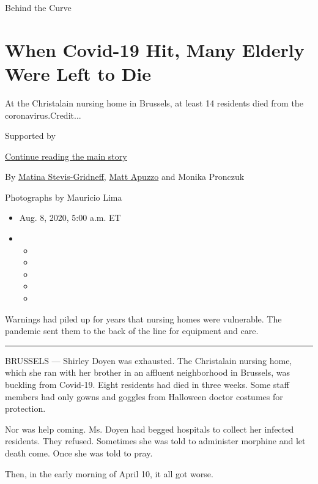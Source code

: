 Behind the Curve

\hypertarget{when-covid-19-hit-many-elderly-were-left-to-die}{%
\section{When Covid-19 Hit, Many Elderly Were Left to
Die}\label{when-covid-19-hit-many-elderly-were-left-to-die}}

At the Christalain nursing home in Brussels, at least 14 residents died
from the coronavirus.Credit...

Supported by

\protect\hyperlink{after-sponsor}{Continue reading the main story}

By \href{https://www.nytimes.com/by/matina-stevis-gridneff}{Matina
Stevis-Gridneff}, \href{https://www.nytimes.com/by/matt-apuzzo}{Matt
Apuzzo} and Monika Pronczuk

Photographs by Mauricio Lima

\begin{itemize}
\item
  Aug. 8, 2020, 5:00 a.m. ET
\item
  \begin{itemize}
  \item
  \item
  \item
  \item
  \item
  \end{itemize}
\end{itemize}

Warnings had piled up for years that nursing homes were vulnerable. The
pandemic sent them to the back of the line for equipment and care.

\begin{center}\rule{0.5\linewidth}{\linethickness}\end{center}

BRUSSELS --- Shirley Doyen was exhausted. The Christalain nursing home,
which she ran with her brother in an affluent neighborhood in Brussels,
was buckling from Covid-19. Eight residents had died in three weeks.
Some staff members had only gowns and goggles from Halloween doctor
costumes for protection.

Nor was help coming. Ms. Doyen had begged hospitals to collect her
infected residents. They refused. Sometimes she was told to administer
morphine and let death come. Once she was told to pray.

Then, in the early morning of April 10, it all got worse.


